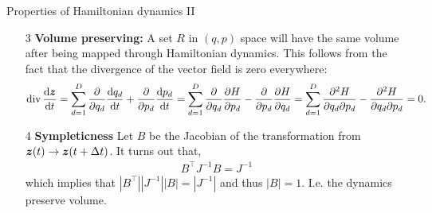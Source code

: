 \documentclass[aspectratio=169]{beamer}
\begin{document}
\begin{frame}[t]{Properties of Hamiltonian dynamics II}

\begin{enumerate}
    \item[3] \textbf{Volume preserving: } A set $R$ in $(q,p)$ space will have the same volume after being mapped through Hamiltonian dynamics. This follows from the fact that the divergence of the vector field is zero everywhere:
    \begin{align}
        \mathrm{div} \, \frac{\mathop{}\!\mathrm{d} \boldsymbol{z}}{\mathop{}\!\mathrm{d} t}
        = \sum_{d=1}^D \frac{\partial }{\partial q_d} \frac{\mathop{}\!\mathrm{d} q_d}{\mathop{}\!\mathrm{d} t} + \frac{\partial }{\partial p_d} \frac{\mathop{}\!\mathrm{d} p_d}{\mathop{}\!\mathrm{d} t}
        = \sum_{d=1}^D \frac{\partial }{\partial q_d} \frac{\partial H}{\partial p_d} - \frac{\partial }{\partial p_d} \frac{\partial H}{\partial q_d}
        = \sum_{d=1}^D \frac{\partial^2 H}{\partial q_d \partial p_d} - \frac{\partial^2 H}{\partial q_d \partial p_d} 
        = 0.
    \end{align}
    
    \item[4] \textbf{Sympleticness} Let $B$ be the Jacobian of the transformation from $\boldsymbol{z}(t) \to \boldsymbol{z}(t + \Delta t)$. It turns out that,
    \begin{align}
        B^\top J^{-1} B = J^{-1} 
    \end{align}
    which implies that $|B^\top| |J^{-1} | |B| = |J^{-1}|$ and thus $|B| = 1$. I.e. the dynamics preserve volume. 
\end{enumerate}
    
\end{frame}
\end{document}
